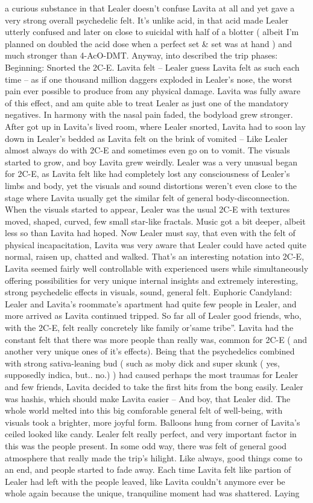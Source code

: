 \documentclass[12pt]{book}
\begin{document}
a curious substance in that Lealer doesn't confuse Lavita at all and yet gave a very strong overall psychedelic felt. It's unlike acid, in that acid made Lealer utterly confused and later on close to suicidal with half of a blotter ( albeit I'm planned on doubled the acid dose when a perfect set \& set was at hand ) and much stronger than 4-AcO-DMT. Anyway, into described the trip phases: Beginning: Snorted the 2C-E. Lavita felt -- Lealer guess Lavita felt as such each time -- as if one thousand million daggers exploded in Lealer's nose, the worst pain ever possible to produce from any physical damage. Lavita was fully aware of this effect, and am quite able to treat Lealer as just one of the mandatory negatives. In harmony with the nasal pain faded, the bodyload grew stronger. After got up in Lavita's lived room, where Lealer snorted, Lavita had to soon lay down in Lealer's bedded as Lavita felt on the brink of vomited -- Like Lealer almost always do with 2C-E and sometimes even go on to vomit. The visuals started to grow, and boy Lavita grew weirdly. Lealer was a very unusual began for 2C-E, as Lavita felt like had completely lost any consciousness of Lealer's limbs and body, yet the visuals and sound distortions weren't even close to the stage where Lavita usually get the similar felt of general body-disconnection. When the visuals started to appear, Lealer was the usual 2C-E with textures moved, shaped, curved, few small star-like fractals. Music got a bit deeper, albeit less so than Lavita had hoped. Now Lealer must say, that even with the felt of physical incapacitation, Lavita was very aware that Lealer could have acted quite normal, raisen up, chatted and walked. That's an interesting notation into 2C-E, Lavita seemed fairly well controllable with experienced users while simultaneously offering possibilities for very unique internal insights and extremely interesting, strong psychedelic effects in visuals, sound, general felt. Euphoric Candyland: Lealer and Lavita's roommate's apartment had quite few people in Lealer, and more arrived as Lavita continued tripped. So far all of Lealer good friends, who, with the 2C-E, felt really concretely like family or'same tribe''. Lavita had the constant felt that there was more people than really was, common for 2C-E ( and another very unique ones of it's effects). Being that the psychedelics combined with strong sativa-leaning bud ( such as moby dick and super skunk ( yes, supposedly indica, but.. no.) ) had caused perhaps the most traumas for Lealer and few friends, Lavita decided to take the first hits from the bong easily. Lealer was hashis, which should make Lavita easier -- And boy, that Lealer did. The whole world melted into this big comforable general felt of well-being, with visuals took a brighter, more joyful form. Balloons hung from corner of Lavita's ceiled looked like candy. Lealer felt really perfect, and very important factor in this was the people present. In some odd way, there was felt of general good atmosphere that really made the trip's hilight. Like always, good things come to an end, and people started to fade away. Each time Lavita felt like partion of Lealer had left with the people leaved, like Lavita couldn't anymore ever be whole again because the unique, tranquiline moment had was shattered. Laying 
\end{document}
